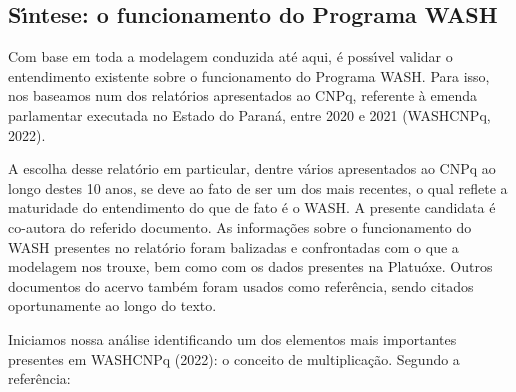 \documentclass[
12pt,		%
openright,	%
twoside,  %
a4paper,			%
chapter=TITLE,		%
english,			%
french,				%
spanish,			%
brazil				%
]{USPSC-classe/USPSC}
\begin{document}
\subsection[S\'{\i}ntese: o funcionamento do Programa WASH]{S\'{\i}ntese: o funcionamento do Programa WASH}\label{S\'{\i}ntese: o funcionamento do Programa WASH}
Com base em toda a modelagem conduzida at\'e aqui, \'e poss\'{\i}vel validar o entendimento existente sobre o funcionamento do Programa WASH. Para isso, nos baseamos num dos relat\'orios apresentados ao CNPq, referente \`a emenda parlamentar executada no Estado do Paran\'a, entre 2020 e 2021  (WASHCNPq, 2022).









A escolha desse relat\'orio em particular, dentre v\'arios apresentados ao CNPq ao longo destes 10 anos, se deve ao fato de ser um dos mais recentes, o qual reflete a maturidade do entendimento do que de fato \'e o WASH. A presente candidata \'e co-autora do referido documento. As informa\c{c}\~oes sobre o funcionamento do WASH presentes no relat\'orio foram balizadas e confrontadas com o que a modelagem nos trouxe, bem como com os dados presentes na Platu\'oxe. Outros documentos do acervo tamb\'em foram usados como refer\^encia, sendo citados oportunamente ao longo do texto.









Iniciamos nossa an\'alise identificando um dos elementos mais importantes presentes em WASHCNPq (2022): o conceito de multiplica\c{c}\~ao. Segundo a refer\^encia:










\noindent\begin{center}\mbox{\centering{}}\end{center}
\end{document}
